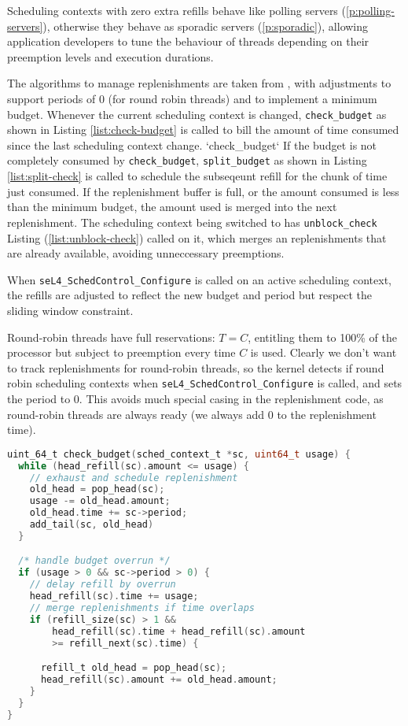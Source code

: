 Scheduling contexts with zero extra refills behave like polling servers (\cref{p:polling-servers}), otherwise they behave as sporadic servers (\cref{p:sporadic}), allowing application developers to tune the behaviour of threads depending on their preemption levels and execution durations.

The algorithms to manage replenishments are taken from \citet{Danish_LW_11}, with adjustments to support periods of 0 (for round robin threads) and to implement a minimum budget.
Whenever the current scheduling context is changed, \texttt{check\_budget} as shown in Listing \ref{list:check-budget} is called to bill the amount of time consumed since the last scheduling context change.
`check\_budget`
If the budget is not completely consumed by \texttt{check\_budget}, \texttt{split\_budget} as shown in Listing \ref{list:split-check} is called to schedule the subseqeunt refill for the chunk of time just consumed.
If the replenishment buffer is full, or the amount consumed is less than the minimum budget, the amount used is merged into the next replenishment.
The scheduling context being switched to has \texttt{unblock\_check} Listing (\ref{list:unblock-check}) called on it, which merges an replenishments that are already available, avoiding unneccessary preemptions.

When \texttt{seL4\_SchedControl\_Configure} is called on an active scheduling context, the refills are adjusted to reflect the new budget and period but respect the sliding window constraint.

Round-robin threads have full reservations: $T = C$, entitling them to 100\% of the processor but subject to preemption every time $C$ is used.
Clearly we don't want to track replenishments for round-robin threads, so the kernel detects if round robin scheduling contexts when \texttt{seL4\_SchedControl\_Configure} is called, and sets the period to 0.
This avoids much special casing in the replenishment code, as round-robin threads are always ready (we always add 0 to the replenishment time).

\begin{lstlisting}[frame=single,language=c,caption=Check budget routine.,label=list:check-budget,float=htpb]
uint_64_t check_budget(sched_context_t *sc, uint64_t usage) {
  while (head_refill(sc).amount <= usage) {
    // exhaust and schedule replenishment
    old_head = pop_head(sc);
    usage -= old_head.amount;
    old_head.time += sc->period;
    add_tail(sc, old_head)
  }

  /* handle budget overrun */
  if (usage > 0 && sc->period > 0) {
    // delay refill by overrun
    head_refill(sc).time += usage;
    // merge replenishments if time overlaps
    if (refill_size(sc) > 1 &&
        head_refill(sc).time + head_refill(sc).amount
        >= refill_next(sc).time) {

      refill_t old_head = pop_head(sc);
      head_refill(sc).amount += old_head.amount;
    }
  }
}
\end{lstlisting}

